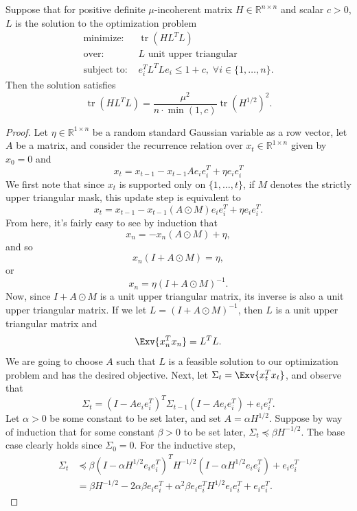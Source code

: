 \begin{toappendix}
\begin{lemma}
Suppose that for positive definite $\mu$-incoherent matrix $H \in \mathbb{R}^{n \times n}$ and scalar $c > 0$, $L$ is the solution to the optimization problem
\begin{align*}
    \mbox{minimize: } & \operatorname{tr}\left(H L^T L\right) \\
    \mbox{over: } & L \text{ unit upper triangular} \\
    \mbox{subject to: } & e_i^T L^T L e_i \le 1 + c, \; \forall i \in \{1,\ldots,n\}.
\end{align*}
Then the solution satisfies
\[
	\operatorname{tr}\left(H L^T L\right) = \frac{\mu^2}{n \cdot \min(1,c)} \operatorname{tr}\left(H^{1/2}\right)^2.
\]
\end{lemma}
\begin{proof}
Let $\eta \in \mathbb{R}^{1 \times n}$ be a random standard Gaussian variable as a row vector, let $A$ be a matrix, and consider the recurrence relation over $x_t \in \mathbb{R}^{1 \times n}$ given by $x_0 = 0$ and
\[
	x_t = x_{t-1} - x_{t-1} A e_i e_i^T + \eta e_i e_i^T 
\]
We first note that since $x_t$ is supported only on $\{1,\ldots,t\}$, if $M$ denotes the strictly upper triangular mask, this update step is equivalent to
\[
	x_t = x_{t-1} - x_{t-1} (A \odot M) e_i e_i^T + \eta e_i e_i^T.
\]
From here, it's fairly easy to see by induction that
\[
	x_n = -x_n (A \odot M) + \eta,
\]
and so
\[
	x_n (I + A \odot M) = \eta,
\]
or
\[
	x_n = \eta (I + A \odot M)^{-1}.
\]
Now, since $I + A \odot M$ is a unit upper triangular matrix, its inverse is also a unit upper triangular matrix. If we let $L = (I + A \odot M)^{-1}$, then $L$ is a unit upper triangular matrix and
\[
	\Exv{x_n^T x_n} = L^T L.
\]
We are going to choose $A$ such that $L$ is a feasible solution to our optimization problem and has the desired objective. Next, let $\Sigma_t = \Exv{x_t^T x_t}$, and observe that
\[
	\Sigma_t = \left( I - A e_i e_i^T \right)^T \Sigma_{t-1} \left( I - A e_i e_i^T \right) + e_i e_i^T.
\]
Let $\alpha > 0$ be some constant to be set later, and set $A = \alpha H^{1/2}$. Suppose by way of induction that for some constant $\beta > 0$ to be set later, $\Sigma_t \preceq \beta H^{-1/2}$. The base case clearly holds since $\Sigma_0 = 0$. For the inductive step,
\begin{align*}
	\Sigma_t 
	&\preceq 
	\beta \left( I - \alpha H^{1/2} e_i e_i^T \right)^T H^{-1/2} \left( I - \alpha H^{1/2} e_i e_i^T \right) + e_i e_i^T
	\\&= 
	\beta H^{-1/2} - 2 \alpha \beta e_i e_i^T + \alpha^2 \beta e_i e_i^T H^{1/2} e_i e_i^T + e_i e_i^T.

\end{align*}
\end{proof}
\end{toappendix}
